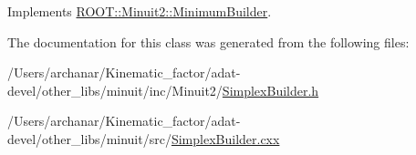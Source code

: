 Implements \mbox{\hyperlink{classROOT_1_1Minuit2_1_1MinimumBuilder_aefaa624436afa8195af1f3393a35981f}{R\+O\+O\+T\+::\+Minuit2\+::\+Minimum\+Builder}}.



The documentation for this class was generated from the following files\+:\begin{DoxyCompactItemize}
\item 
/\+Users/archanar/\+Kinematic\+\_\+factor/adat-\/devel/other\+\_\+libs/minuit/inc/\+Minuit2/\mbox{\hyperlink{adat-devel_2other__libs_2minuit_2inc_2Minuit2_2SimplexBuilder_8h}{Simplex\+Builder.\+h}}\item 
/\+Users/archanar/\+Kinematic\+\_\+factor/adat-\/devel/other\+\_\+libs/minuit/src/\mbox{\hyperlink{adat-devel_2other__libs_2minuit_2src_2SimplexBuilder_8cxx}{Simplex\+Builder.\+cxx}}\end{DoxyCompactItemize}
